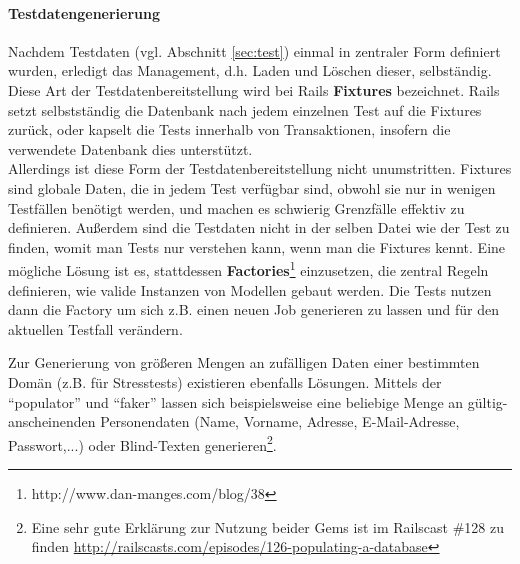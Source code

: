 \paragraph{Testdatengenerierung}
Nachdem Testdaten (vgl. Abschnitt \ref{sec:test}) einmal in zentraler Form definiert wurden, erledigt  das Management, d.h. Laden und Löschen dieser, selbständig. Diese Art der Testdatenbereitstellung wird bei Rails \textbf{Fixtures} bezeichnet. Rails setzt selbstständig die Datenbank nach jedem einzelnen Test auf die Fixtures zurück, oder kapselt die Tests innerhalb von Transaktionen, insofern die verwendete Datenbank dies unterstützt.\\
Allerdings ist diese Form der Testdatenbereitstellung nicht unumstritten. Fixtures sind globale Daten, die in jedem Test verfügbar sind, obwohl sie nur in wenigen Testfällen benötigt werden, und machen es schwierig Grenzfälle effektiv zu definieren. Außerdem sind die Testdaten nicht in der selben Datei wie der Test zu finden, womit man Tests nur verstehen kann, wenn man die Fixtures kennt. Eine mögliche Lösung ist es, stattdessen \textbf{Factories}\footnote{http://www.dan-manges.com/blog/38} einzusetzen, die zentral Regeln definieren, wie valide Instanzen von Modellen gebaut werden. Die Tests nutzen dann die Factory um sich z.B. einen neuen Job generieren zu lassen und für den aktuellen Testfall verändern.

Zur Generierung von größeren Mengen an zufälligen Daten einer bestimmten Domän (z.B. für Stresstests) existieren ebenfalls Lösungen. Mittels der  "`populator"' und "`faker"' lassen sich beispielsweise eine beliebige Menge an gültig-anscheinenden Personendaten (Name, Vorname, Adresse, E-Mail-Adresse, Passwort,...) oder Blind-Texten generieren\footnote{Eine sehr gute Erklärung zur Nutzung beider Gems ist im Railscast \#128 zu finden \url{http://railscasts.com/episodes/126-populating-a-database}}.


